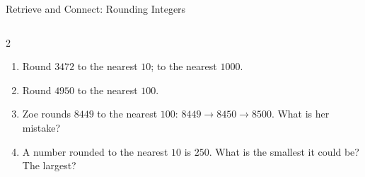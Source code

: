 \documentclass{beamer}
\newcommand{\ashow}[1]{\uncover<2->{\textcolor{red}{\small #1}}}
\begin{document}
\begin{frame}{Retrieve and Connect: Rounding Integers}
\begin{columns}[T]
\begin{multicols}{2}
\begin{enumerate}
  \item Round $3472$ to the nearest $10$; to the nearest $1000$. \ashow{$3470$ and $3000$}

  \columnbreak

  \item Round $4950$ to the nearest $100$. \ashow{$5000$}

  \item Zoe rounds $8449$ to the nearest $100$: $8449\to 8450\to 8500$. What is her mistake? \ashow{Rounded twice: only the tens digit $4$ counts, so $8400$}

  \item A number rounded to the nearest $10$ is $250$. What is the smallest it could be? The largest? \ashow{$245$ and $254$}

\end{enumerate}
\end{multicols}

\end{columns}

\end{frame}
\end{document}
